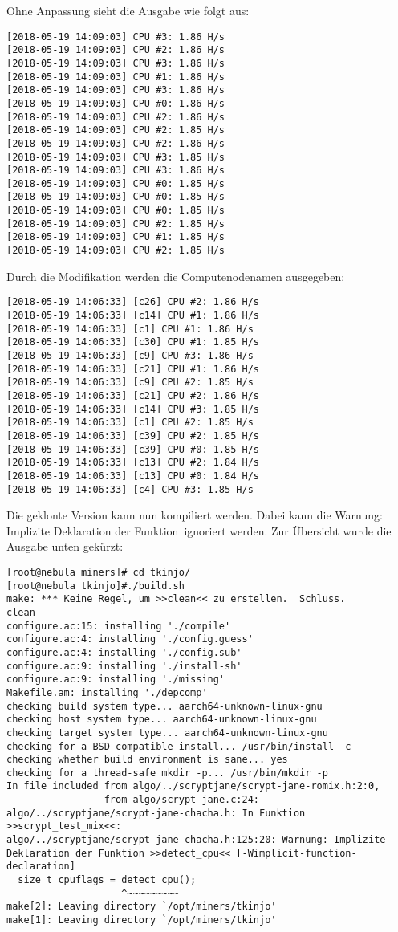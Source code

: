 Ohne Anpassung sieht die Ausgabe wie folgt aus:
\begin{lstlisting}
[2018-05-19 14:09:03] CPU #3: 1.86 H/s
[2018-05-19 14:09:03] CPU #2: 1.86 H/s
[2018-05-19 14:09:03] CPU #3: 1.86 H/s
[2018-05-19 14:09:03] CPU #1: 1.86 H/s
[2018-05-19 14:09:03] CPU #3: 1.86 H/s
[2018-05-19 14:09:03] CPU #0: 1.86 H/s
[2018-05-19 14:09:03] CPU #2: 1.86 H/s
[2018-05-19 14:09:03] CPU #2: 1.85 H/s
[2018-05-19 14:09:03] CPU #2: 1.86 H/s
[2018-05-19 14:09:03] CPU #3: 1.85 H/s
[2018-05-19 14:09:03] CPU #3: 1.86 H/s
[2018-05-19 14:09:03] CPU #0: 1.85 H/s
[2018-05-19 14:09:03] CPU #0: 1.85 H/s
[2018-05-19 14:09:03] CPU #0: 1.85 H/s
[2018-05-19 14:09:03] CPU #2: 1.85 H/s
[2018-05-19 14:09:03] CPU #1: 1.85 H/s
[2018-05-19 14:09:03] CPU #2: 1.85 H/s
\end{lstlisting}
Durch die Modifikation werden die Computenodenamen ausgegeben:
\begin{lstlisting}
[2018-05-19 14:06:33] [c26] CPU #2: 1.86 H/s
[2018-05-19 14:06:33] [c14] CPU #1: 1.86 H/s
[2018-05-19 14:06:33] [c1] CPU #1: 1.86 H/s
[2018-05-19 14:06:33] [c30] CPU #1: 1.85 H/s
[2018-05-19 14:06:33] [c9] CPU #3: 1.86 H/s
[2018-05-19 14:06:33] [c21] CPU #1: 1.86 H/s
[2018-05-19 14:06:33] [c9] CPU #2: 1.85 H/s
[2018-05-19 14:06:33] [c21] CPU #2: 1.86 H/s
[2018-05-19 14:06:33] [c14] CPU #3: 1.85 H/s
[2018-05-19 14:06:33] [c1] CPU #2: 1.85 H/s
[2018-05-19 14:06:33] [c39] CPU #2: 1.85 H/s
[2018-05-19 14:06:33] [c39] CPU #0: 1.85 H/s
[2018-05-19 14:06:33] [c13] CPU #2: 1.84 H/s
[2018-05-19 14:06:33] [c13] CPU #0: 1.84 H/s
[2018-05-19 14:06:33] [c4] CPU #3: 1.85 H/s
\end{lstlisting}
Die geklonte Version kann nun kompiliert werden. Dabei kann die Warnung: \grqq Implizite Deklaration der Funktion\grqq \ ignoriert werden. Zur Übersicht wurde die Ausgabe unten gekürzt:
\begin{lstlisting}
[root@nebula miners]# cd tkinjo/
[root@nebula tkinjo]#./build.sh
make: *** Keine Regel, um >>clean<< zu erstellen.  Schluss.
clean
configure.ac:15: installing './compile'
configure.ac:4: installing './config.guess'
configure.ac:4: installing './config.sub'
configure.ac:9: installing './install-sh'
configure.ac:9: installing './missing'
Makefile.am: installing './depcomp'
checking build system type... aarch64-unknown-linux-gnu
checking host system type... aarch64-unknown-linux-gnu
checking target system type... aarch64-unknown-linux-gnu
checking for a BSD-compatible install... /usr/bin/install -c
checking whether build environment is sane... yes
checking for a thread-safe mkdir -p... /usr/bin/mkdir -p
In file included from algo/../scryptjane/scrypt-jane-romix.h:2:0,
                 from algo/scrypt-jane.c:24:
algo/../scryptjane/scrypt-jane-chacha.h: In Funktion >>scrypt_test_mix<<:
algo/../scryptjane/scrypt-jane-chacha.h:125:20: Warnung: Implizite Deklaration der Funktion >>detect_cpu<< [-Wimplicit-function-declaration]
  size_t cpuflags = detect_cpu();
                    ^~~~~~~~~~
make[2]: Leaving directory `/opt/miners/tkinjo'
make[1]: Leaving directory `/opt/miners/tkinjo'
\end{lstlisting}
 
